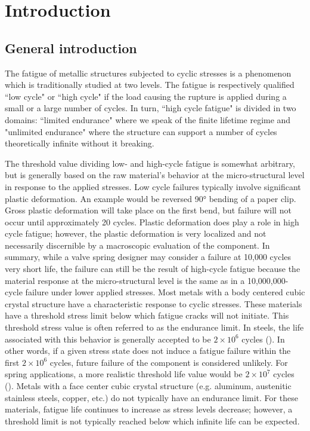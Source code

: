 \chapter{Introduction} \label{chp:1}
\minitoc

\section{General introduction}
The fatigue of metallic structures subjected to cyclic stresses is a phenomenon
which is traditionally studied at two levels. The fatigue is respectively qualified
``low cycle" or ``high cycle" if the load causing the rupture is applied
during a small or a large number of cycles. In turn, ``high cycle fatigue" is divided
in two domains: ``limited endurance" where we speak of the finite lifetime regime
and "unlimited endurance" where the structure can support a number of cycles theoretically
infinite without it breaking. 

The threshold value dividing low- and high-cycle fatigue is somewhat arbitrary, but is generally
based on the raw material’s behavior at the micro-structural level in response to the applied stresses. Low cycle
failures typically involve significant plastic deformation. An example would be reversed 90° bending
of a paper clip. Gross plastic deformation will take place on the first bend, but failure will not occur until
approximately 20 cycles. Plastic deformation does play a role in high cycle fatigue; however, the plastic
deformation is very localized and not necessarily discernible by a macroscopic evaluation of the
component. In summary, while a valve spring designer may consider a failure at 10,000 cycles very short
life, the failure can still be the result of high-cycle fatigue because the material response at the
micro-structural level is the same as in a 10,000,000-cycle failure under lower applied stresses.
Most metals with a body centered cubic crystal structure have a characteristic response to cyclic stresses.
These materials have a threshold stress limit below which fatigue cracks will not initiate. This threshold
stress value is often referred to as the endurance limit. In steels, the life associated with this behavior is
generally accepted to be $2\times10^6$ cycles (\cite{stone2012fatigue}). In other words, if a given stress state does not induce a fatigue failure within the first $2\times10^6$ cycles, future failure of the component is considered unlikely. For spring
applications, a more realistic threshold life value would be $2\times10^7$ cycles (\cite{stone2012fatigue}). Metals with a face center cubic crystal structure (e.g. aluminum, austenitic stainless steels, copper, etc.) do not typically have an endurance
limit. For these materials, fatigue life continues to increase as stress levels decrease; however, a threshold
limit is not typically reached below which infinite life can be expected.

